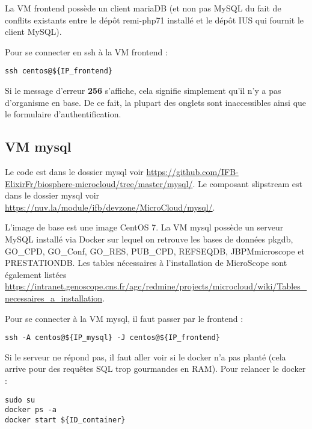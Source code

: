 La VM frontend possède un client mariaDB (et non pas MySQL du fait de conflits existants entre le dépôt remi-php71 installé et le dépôt IUS qui fournit le client MySQL).\newline

Pour se connecter en ssh à la VM frontend : 
\begin{lstlisting}[style=Bash]
ssh centos@${IP_frontend}
\end{lstlisting}

\begin{mycolorbox}Si le message d’erreur \textbf{256} s’affiche, cela signifie simplement qu’il n’y a pas d’organisme en base. De ce fait, la plupart des onglets sont inaccessibles ainsi que le formulaire d’authentification.
\end{mycolorbox}

\subsection {VM mysql}\label{mysql}

Le code est dans le dossier mysql voir \url{https://github.com/IFB-ElixirFr/biosphere-microcloud/tree/master/mysql/}.
Le composant slipstream est dans le dossier mysql voir \url{https://nuv.la/module/ifb/devzone/MicroCloud/mysql/}.

L'image de base est une image CentOS 7.
La VM mysql possède un serveur MySQL installé via Docker sur lequel on retrouve les bases de données pkgdb, GO\_CPD, GO\_Conf, GO\_RES, PUB\_CPD, REFSEQDB, JBPMmicroscope et PRESTATIONDB.
\newline
Les tables nécessaires à l'installation de MicroScope sont également listées \url{https://intranet.genoscope.cns.fr/agc/redmine/projects/microcloud/wiki/Tables_necessaires_a_installation}.
\newline

Pour se connecter à la VM mysql, il faut passer par le frontend :
\begin{lstlisting}[style=bash]
ssh -A centos@${IP_mysql} -J centos@${IP_frontend}
\end{lstlisting}
\bigskip

Si le serveur ne répond pas, il faut aller voir si le docker n'a pas planté (cela arrive pour des requêtes SQL trop gourmandes en RAM).
Pour relancer le docker :
\begin{lstlisting}[style=bash]
sudo su
docker ps -a
docker start ${ID_container}
\end{lstlisting}

